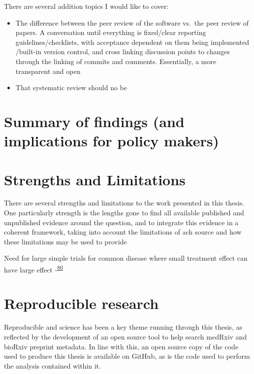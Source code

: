 \documentclass[a4paper, twoside]{templates/ociamthesis}
\begin{document}
There are several addition topics I would like to cover:

\begin{itemize}
\item
  The difference between the peer review of the software vs.~the peer review of papers. A conversation until everything is fixed/clear reporting guidelines/checklists, with acceptance dependent on them being implemented /built-in version control, and cross linking discussion points to changes through the linking of commits and comments. Essentially, a more transparent and open
\item
  That systematic review should no be
\end{itemize}

\hypertarget{summary-of-findings-and-implications-for-policy-makers}{%
\section{Summary of findings (and implications for policy makers)}\label{summary-of-findings-and-implications-for-policy-makers}}

\hypertarget{strengths-and-limitations-1}{%
\section{Strengths and Limitations}\label{strengths-and-limitations-1}}

There are several strengths and limitations to the work presented in this thesis. One particularly strength is the lengths gone to find all available published and unpublished evidence around the question, and to integrate this evidence in a coherent framework, taking into account the limitations of ach source and how these limitations may be used to provide

Need for large simple trials for common disease where small treatment effect can have large effect -\textsuperscript{\protect\hyperlink{ref-yusuf1984}{80}}

\hypertarget{reproducible-research}{%
\section{Reproducible research}\label{reproducible-research}}

Reproducible and science has been a key theme running through this thesis, as reflected by the development of an open source tool to help search medRxiv and bioRxiv preprint metadata. In line with this, an open source copy of the code used to produce this thesis is available on GitHub, as is the code used to perform the analysis contained within it.
\end{document}
